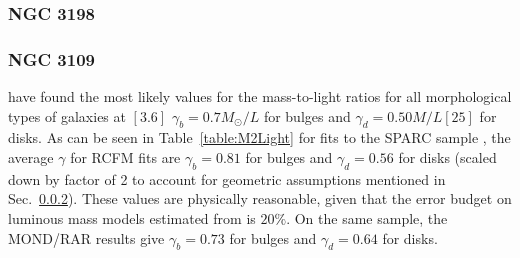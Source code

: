\documentclass[reprint,%
 amsmath,amssymb,
 aps,
]{revtex4-1}
\begin{document}
\subsubsection{NGC 3198}

\subsubsection{NGC 3109}
 
 
 \citet{McGaugh2016RAR} have found the most likely values for the mass-to-light ratios for all morphological types of galaxies at $[3.6]$
    $\gamma_{b} = 0.7 M_\odot/L$ for bulges  and $\gamma_{d}= 0.50 M/L [25]$ for disks.         As can be seen in Table~\ref{table:M2Light} for fits to the  SPARC sample , the average $\gamma$  for RCFM fits are $\gamma_b = 0.81$ for bulges and $\gamma_d = 0.56$ for disks  (scaled down by factor of 2 to account for geometric assumptions mentioned in Sec.~\ref{}).  
 These values are physically reasonable, given that 
    the error budget on luminous mass models  estimated from  \cite{2016Lelli} is $20\%$.  On the same sample, the 
  MOND/RAR results give $\gamma_b = 0.73$ for bulges and $\gamma_d = 0.64$ for disks.
    
     

   
   
   
   

    
  
 
 
 
\end{document}
